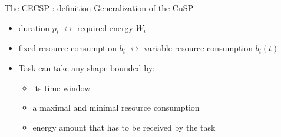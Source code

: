 \begin{frame}{The CECSP : definition }
  Generalization of the CuSP
  \begin{itemize}
    \vfill
  \item duration $p_i$ $\leftrightarrow$ required energy  $W_i$
    \vfill
  \item fixed resource consumption $b_i$ $\leftrightarrow$ variable
    resource consumption $b_i(t)$ 
    \vfill  
  \item Task can take any shape bounded by:
    \begin{itemize}
    \item its \textcolor<1>{blue!80!black!80!}{time-window}
    \item a \textcolor<1>{green!60!black!80}{maximal and minimal resource consumption}
    \item \textcolor<1>{red!80!black!80}{energy amount} that has to be received by the task
    \end{itemize}
    \vfill
  \end{itemize}
  \begin{overlayarea}{\textwidth}{3cm}
     {
      \vfill
      \begin{columns}
        \begin{column}{0.45\linewidth}
          
        \end{column}
        \begin{column}{0.45\linewidth}
          
        \end{column}
      \end{columns}
      \vfill}
  \end{overlayarea}
\end{frame}

